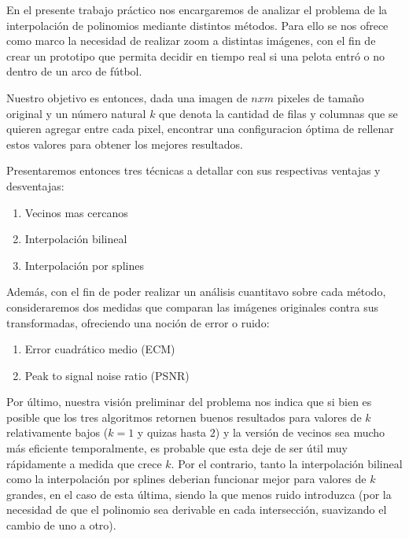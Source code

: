 En el presente trabajo práctico nos encargaremos de analizar el problema de la interpolación de polinomios mediante distintos métodos.
Para ello se nos ofrece como marco la necesidad de realizar zoom a distintas imágenes, con el fin de crear un prototipo que permita decidir en tiempo
real si una pelota entró o no dentro de un arco de fútbol.

Nuestro objetivo es entonces, dada una imagen de $n x m$ pixeles de tamaño original y un número natural $k$ que denota la cantidad de filas y
columnas que se quieren agregar entre cada pixel, encontrar una configuracion óptima de rellenar estos valores para obtener los mejores resultados.

Presentaremos entonces tres técnicas a detallar con sus respectivas ventajas y desventajas:
\begin{enumerate}
 \item Vecinos mas cercanos
 \item Interpolación bilineal
 \item Interpolación por splines
\end{enumerate}

Además, con el fin de poder realizar un análisis cuantitavo sobre cada método, consideraremos dos medidas que comparan las imágenes
originales contra sus transformadas, ofreciendo una noción de error o ruido:
\begin{enumerate}
 \item Error cuadrático medio (ECM)
 \item Peak to signal noise ratio (PSNR)
\end{enumerate}

Por último, nuestra visión preliminar del problema nos indica que si bien es posible que los tres algoritmos retornen buenos resultados
para valores de $k$ relativamente bajos ($k = 1$ y quizas hasta $2$) y la versión de vecinos sea mucho más eficiente temporalmente,
es probable que esta deje de ser útil muy rápidamente a medida que crece $k$. Por el contrario, tanto la interpolación bilineal como la
interpolación por splines deberian funcionar mejor para valores de $k$ grandes, en el caso de esta última, siendo la que menos ruido introduzca
(por la necesidad de que el polinomio sea derivable en cada intersección, suavizando el cambio de uno a otro).
